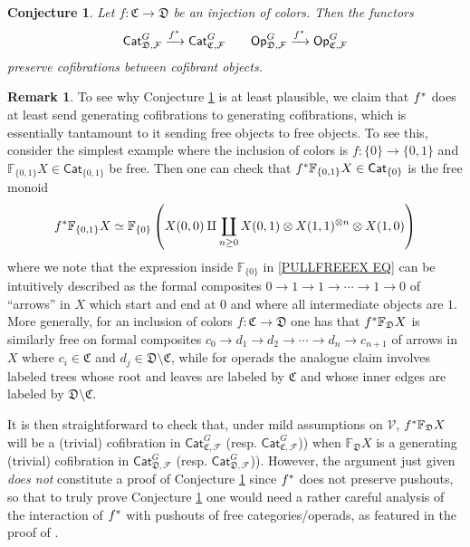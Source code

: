\documentclass[a4paper,10pt
,draft
]{article}%
\numberwithin{equation}{section}
\numberwithin{figure}{section}
\newtheorem{conjecture}[equation]{Conjecture}%
\theoremstyle{definition} %
\newtheorem{remark}[equation]{Remark}%
\newcommand{\F}{\ensuremath{\mathcal F}}
\newcommand{\V}{\ensuremath{\mathcal V}}
\newcommand{\1}{\ensuremath{\mathbbm 1}}%
\begin{document}
\begin{conjecture}\label{CATOP CONJ}
Let $f \colon \mathfrak{C} \to \mathfrak{D}$
be an injection of colors.
Then the functors
\[
	\mathsf{Cat}_{\mathfrak{D},\F}^G
	\xrightarrow{f^{\**}}
	\mathsf{Cat}_{\mathfrak{C},\F}^G
\qquad
	\mathsf{Op}_{\mathfrak{D},\F}^G
	\xrightarrow{f^{\**}}
	\mathsf{Op}_{\mathfrak{C},\F}^G
\]
preserve cofibrations between cofibrant objects.
\end{conjecture}




\begin{remark}
To see why Conjecture \ref{CATOP CONJ} is at least plausible,
we claim that $f^{\**}$ does at least send generating cofibrations to generating cofibrations, 
which is essentially tantamount to it sending free objects to free objects.
To see this, consider the simplest example 
where the inclusion of colors is 
$f \colon \{0\} \to \{0,1\}$
and $\mathbb{F}_{\{0,1\}}X \in \mathsf{Cat}_{\{0,1\}}$ be free.
Then one can check that $f^{\**} \mathbb{F}_{\{0,1\}}X \in \mathsf{Cat}_{\{0\}}$ is the free monoid
\begin{equation}\label{PULLFREEEX EQ}
	f^{\**} \mathbb{F}_{\{0,1\}}X
\simeq
	\mathbb{F}_{\{0\}}
	\left(X(0,0) \amalg 
	\coprod_{n \geq 0}
	X(0,1)\otimes X(1,1)^{\otimes n} \otimes X(1,0) 
	\right)
\end{equation}
where we note that the expression inside
$\mathbb{F}_{\{0\}}$
in \eqref{PULLFREEEX EQ}
can be intuitively described as the formal composites
$0 \to 1 \to 1 \to \cdots \to 1 \to 0$
of ``arrows'' in $X$ which start and end at $0$ and where all intermediate objects are $1$.
More generally, for an inclusion of colors 
$f \colon \mathfrak{C} \to \mathfrak{D}$
one has that $f^{\**} \mathbb{F}_{\mathfrak{D}} X$
is similarly free on formal composites
$c_0 \to d_1 \to d_2 \to \cdots \to d_n \to c_{n+1}$
of arrows in $X$
where $c_i \in \mathfrak{C}$
and $d_j \in \mathfrak{D} \setminus \mathfrak{C}$,
while for operads the analogue claim involves labeled trees whose root and leaves are labeled by $\mathfrak{C}$
and whose inner edges are labeled by 
$\mathfrak{D} \setminus \mathfrak{C}$.
 
It is then straightforward to check that, under mild assumptions on $\V$,
$f^{\**} \mathbb{F}_{\mathfrak{D}} X$
will be a (trivial) cofibration in 
$\mathsf{Cat}^G_{\mathfrak{C},\F}$
(resp. $\mathsf{Cat}^G_{\mathfrak{C},\F}$))
when $\mathbb{F}_{\mathfrak{D}} X$
is a generating (trivial) cofibration
in $\mathsf{Cat}^G_{\mathfrak{D},\F}$
(resp. $\mathsf{Cat}^G_{\mathfrak{D},\F}$)).
However, the argument just given \emph{does not} constitute a proof of Conjecture \ref{CATOP CONJ}
since $f^{\**}$ does not preserve pushouts, 
so that to truly prove Conjecture \ref{CATOP CONJ}
one would need a rather careful analysis of the interaction of $f^{\**}$ with pushouts of free categories/operads, 
as featured in the proof of \cite[Thm. 1.15]{BM13}.


\end{remark}
\end{document}
